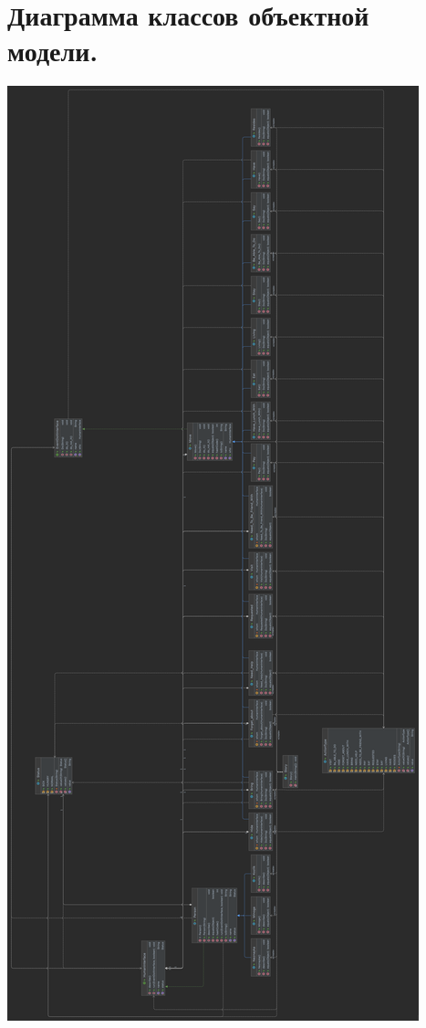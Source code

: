\documentclass[12pt,onecolumn]{article}
\begin{document}
\section{Диаграмма классов объектной модели.}
\includegraphics[scale=0.07]{UML.png}
\end{document}

